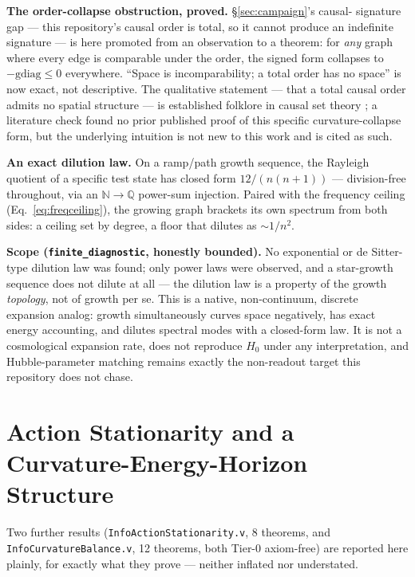 \documentclass[10pt,twocolumn]{article}
\begin{document}
\textbf{The order-collapse obstruction, proved.} \S\ref{sec:campaign}'s causal-
signature gap --- this repository's causal order is total, so it cannot produce an
indefinite signature --- is here promoted from an observation to a theorem: for
\emph{any} graph where every edge is comparable under the order, the signed form
collapses to $-\mathrm{gdiag} \le 0$ everywhere. ``Space is incomparability; a total
order has no space'' is now exact, not descriptive. The qualitative statement ---
that a total causal order admits no spatial structure --- is established folklore
in causal set theory \cite{surya2019}; a literature check found no prior published
proof of this specific curvature-collapse form, but the underlying intuition is
not new to this work and is cited as such.

\textbf{An exact dilution law.} On a ramp/path growth sequence, the Rayleigh quotient
of a specific test state has closed form $12/(n(n+1))$ --- division-free throughout,
via an $\mathbb{N}\to\mathbb{Q}$ power-sum injection. Paired with the frequency
ceiling (Eq.~\ref{eq:freqceiling}), the growing graph brackets its own spectrum from
both sides: a ceiling set by degree, a floor that dilutes as $\sim 1/n^2$.

\textbf{Scope (\texttt{finite\_diagnostic}, honestly bounded).} No exponential or de
Sitter-type dilution law was found; only power laws were observed, and a star-growth
sequence does not dilute at all --- the dilution law is a property of the growth
\emph{topology}, not of growth per se. This is a native, non-continuum, discrete
expansion analog: growth simultaneously curves space negatively, has exact energy
accounting, and dilutes spectral modes with a closed-form law. It is not a
cosmological expansion rate, does not reproduce $H_0$ under any interpretation, and
Hubble-parameter matching remains exactly the non-readout target this repository
does not chase.

\section{Action Stationarity and a Curvature-Energy-Horizon Structure}
\label{sec:action}
Two further results (\texttt{InfoActionStationarity.v}, 8 theorems, and
\texttt{InfoCurvatureBalance.v}, 12 theorems, both Tier-0 axiom-free) are reported
here plainly, for exactly what they prove --- neither inflated nor understated.
\end{document}
